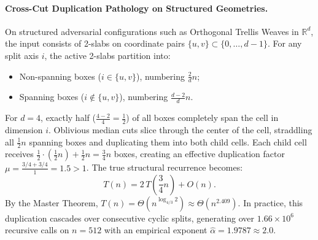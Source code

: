 \documentclass[11pt,a4paper]{article}
\theoremstyle{plain}
\theoremstyle{definition}
\begin{document}
\paragraph{Cross-Cut Duplication Pathology on Structured Geometries.}
On structured adversarial configurations such as Orthogonal Trellis Weaves in $\mathbb{R}^d$, the input consists of 2-slabs on coordinate pairs $\{u, v\} \subset \{0, \dots, d-1\}$. For any split axis $i$, the active 2-slabs partition into:
\begin{itemize}
    \item Non-spanning boxes ($i \in \{u, v\}$), numbering $\frac{2}{d} n$;
    \item Spanning boxes ($i \notin \{u, v\}$), numbering $\frac{d-2}{d} n$.
\end{itemize}
For $d = 4$, exactly half ($\frac{4-2}{4} = \frac{1}{2}$) of all boxes completely span the cell in dimension $i$. Oblivious median cuts slice through the center of the cell, straddling all $\frac{1}{2} n$ spanning boxes and duplicating them into both child cells. Each child cell receives $\frac{1}{2} \cdot (\frac{1}{2} n) + \frac{1}{2} n = \frac{3}{4} n$ boxes, creating an effective duplication factor $\mu = \frac{3/4 + 3/4}{1} = 1.5 > 1$. The true structural recurrence becomes:
\begin{equation}
T(n) = 2\, T\left(\frac{3}{4} n\right) + O(n).
\end{equation}
By the Master Theorem, $T(n) = \Theta\left(n^{\log_{4/3} 2}\right) \approx \Theta(n^{2.409})$. In practice, this duplication cascades over consecutive cyclic splits, generating over $1.66 \times 10^6$ recursive calls on $n = 512$ with an empirical exponent $\hat{\alpha} = 1.9787 \approx 2.0$.
\end{document}
